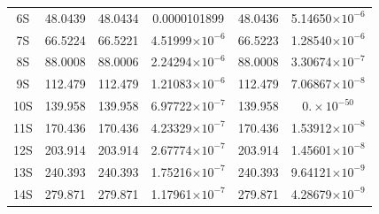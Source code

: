 \documentclass[cs4size,titlepage,twoside]{ctexart}
\begin{document}
\begin{table}[!bp]
\begin{tabular}{|cccccc|}
		6S                    & 48.0439                                  & 48.0434                                        & 0.0000101899                                   & 48.0436                                                                            & 5.14650$\times10^{-6}$   \\
		7S                    & 66.5224                                  & 66.5221                                        & 4.51999$\times10^{-6}$                         & 66.5223                                                                            & 1.28540$\times10^{-6}$   \\
		8S                    & 88.0008                                  & 88.0006                                        & 2.24294$\times10^{-6}$                         & 88.0008                                                                            & 3.30674$\times10^{-7}$   \\
		9S                    & 112.479                                  & 112.479                                        & 1.21083$\times10^{-6}$                         & 112.479                                                                            & 7.06867$\times10^{-8}$   \\
		10S                   & 139.958                                  & 139.958                                        & 6.97722$\times10^{-7}$                         & 139.958                                                                            & $0.\times10^{-50}$       \\
		11S                   & 170.436                                  & 170.436                                        & 4.23329$\times10^{-7}$                         & 170.436                                                                            & 1.53912$\times10^{-8}$   \\
		12S                   & 203.914                                  & 203.914                                        & 2.67774$\times10^{-7}$                         & 203.914                                                                            & 1.45601$\times10^{-8}$   \\
		13S                   & 240.393                                  & 240.393                                        & 1.75216$\times10^{-7}$                         & 240.393                                                                            & 9.64121$\times10^{-9}$   \\
		14S                   & 279.871                                  & 279.871                                        & 1.17961$\times10^{-7}$                         & 279.871                                                                            & 4.28679$\times10^{-9}$   \\

\end{tabular}
\end{table}
\end{document}
